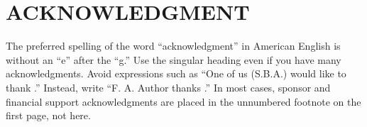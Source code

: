 \section*{ACKNOWLEDGMENT}
The preferred spelling of the word ``acknowledgment'' in American English is 
without an ``e'' after the ``g.'' Use the singular heading even if you have 
many acknowledgments. Avoid expressions such as ``One of us (S.B.A.) would 
like to thank \textellipsis .'' Instead, write ``F. A. Author thanks \textellipsis .'' In most 
cases, sponsor and financial support acknowledgments are placed in the 
unnumbered footnote on the first page, not here.